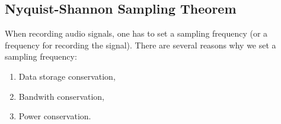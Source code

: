 \subsection{Nyquist-Shannon Sampling Theorem}
When recording audio signals, one has to set a sampling frequency (or a frequency for recording the signal). There are several reasons why we set a sampling frequency:
\begin{enumerate}
	\item Data storage conservation,
	\item Bandwith conservation,
	\item Power conservation.
\end{enumerate}